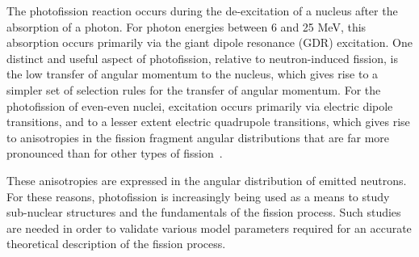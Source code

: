 \label{sec:level1}
The photofission reaction occurs during the de-excitation of a nucleus after the absorption of a photon.
For photon energies between 6 and 25 MeV, this absorption occurs primarily via the giant dipole resonance (GDR) excitation.
One distinct and useful aspect of photofission, relative to neutron-induced fission, is the low transfer of angular momentum to the nucleus, which gives rise to a simpler set of selection rules for the transfer of angular momentum.
For the photofission of even-even nuclei, excitation occurs primarily via electric dipole transitions, and to a lesser extent electric quadrupole transitions, which gives rise to anisotropies in the fission fragment angular distributions that are far more pronounced than for other types of fission~\cite{1977FragAss,Mueller2014}.

These anisotropies are expressed in the angular distribution of emitted neutrons.
For these reasons, photofission is increasingly being used as a means to study sub-nuclear structures and the fundamentals of the fission process.
Such studies are needed in order to validate various model parameters required for an accurate theoretical description of the fission process.